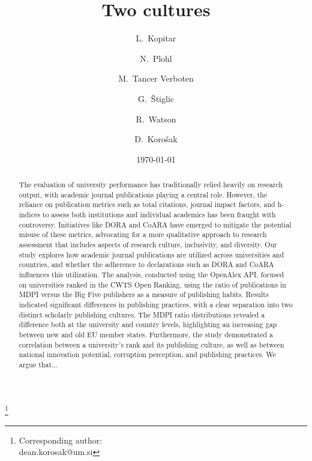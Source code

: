 \documentclass[amsfonts, amssymb, prl, superscriptaddress, notitlepage, twocolumn, nofootinbib]{revtex4-2}
\begin{document}
\title{Two cultures}
\author{L.~Kopitar }

\author{N.~Plohl}

\author{M.~Tancer Verboten}


\author{G.~Štiglic }

\author{R.~Watson }

\author{D.~Korošak  }
\thanks{Corresponding author:\\dean.korosak@um.si}




\date{\today}

\begin{abstract}
The evaluation of university performance has traditionally relied heavily on research output, with academic journal publications playing a central role. However, the reliance on publication metrics such as total citations, journal impact factors, and h-indices to assess both institutions and individual academics has been fraught with controversy. Initiatives like DORA and CoARA have emerged to mitigate the potential misuse of these metrics, advocating for a more qualitative approach to research assessment that includes aspects of research culture, inclusivity, and diversity. Our study explores how academic journal publications are utilized across universities and countries, and whether the adherence to declarations such as DORA and CoARA influences this utilization. The analysis, conducted using the OpenAlex API, focused on universities ranked in the CWTS Open Ranking, using the ratio of publications in MDPI versus the Big Five publishers as a measure of publishing habits. Results indicated significant differences in publishing practices, with a clear separation into two distinct scholarly publishing cultures. The MDPI ratio distributions revealed a difference both at the university and country levels, highlighting an increasing gap between new and old EU member states. Furthermore, the study demonstrated a correlation between a university's rank and its publishing culture, as well as between national innovation potential, corruption perception, and publishing practices. We argue that...
\end{abstract}
\end{document}
